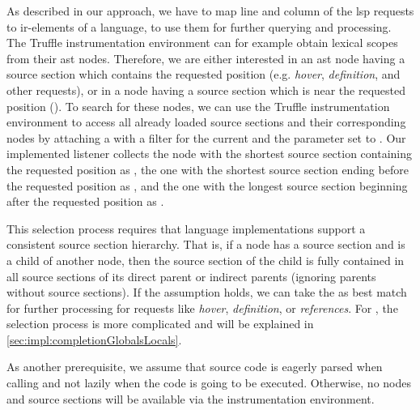     As described in our approach, we have to map line and column of the \ac{lsp} requests to \ac{ir}-elements of a language, to use them for further querying and processing. The Truffle instrumentation environment can for example obtain lexical scopes from their \ac{ast} nodes. Therefore, we are either interested in an \ac{ast} node having a source section which contains the requested position (e.g. \emph{hover}, \emph{definition}, and other requests), or in a node having a source section which is near the requested position (\completionOfGlobaslAndLocals). To search for these nodes, we can use the Truffle instrumentation environment to access all already loaded source sections and their corresponding nodes by attaching a  with a filter for the current  and the  parameter set to . Our implemented listener collects the node with the shortest source section containing the requested position as , the one with the shortest source section ending before the requested position as , and the one with the longest source section beginning after the requested position as .
    
    This selection process requires that language implementations support a consistent source section hierarchy. That is, if a node has a source section and is a child of another node, then the source section of the child is fully contained in all source sections of its direct parent or indirect parents (ignoring parents without source sections). If the assumption holds, we can take the  as best match for further processing for requests like \emph{hover}, \emph{definition}, or \emph{references}. For \completionOfGlobaslAndLocals, the selection process is more complicated and will be explained in \autoref{sec:impl:completionGlobalsLocals}.
    
    As another prerequisite, we assume that source code is eagerly parsed when calling  and not lazily when the code is going to be executed. Otherwise, no nodes and source sections will be available via the instrumentation environment.

